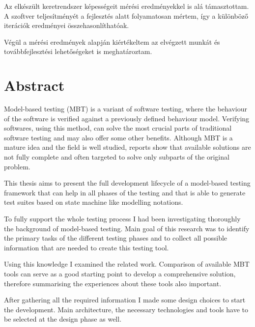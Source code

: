 Az elkészült keretrendszer képességeit mérési eredményekkel is alá támasztottam. A szoftver teljesítményét a fejlesztés alatt folyamatosan mértem, így a különböző iterációk eredményei összehasonlíthatóak.

Végül a mérési eredmények alapján kiértékeltem az elvégzett munkát és továbbfejlesztési lehetőségeket is meghatároztam.

\vfill
{}
\englishParagraph


\chapter*{Abstract}
\label{cha:abstract}

Model-based testing (MBT) is a variant of software testing, where the behaviour of the software is verified against a previously defined behaviour model. Verifying softwares, using this method, can solve the most crucial parts of traditional software testing and may also offer some other benefits. Although MBT is a mature idea and the field is well studied, reports show that available solutions are not fully complete and often targeted to solve only subparts of the original problem.

This thesis aims to present the full development lifecycle of a model-based testing framework that can help in all phases of the testing and that is able to generate test suites based on state machine like modelling notations.

To fully support the whole testing process I had been investigating thoroughly the background of model-based testing. Main goal of this research was to identify the primary tasks of the different testing phases and to collect all possible information that are needed to create this testing tool.

Using this knowledge I examined the related work. Comparison of available MBT tools can serve as a good starting point to develop a comprehensive solution, therefore summarising the experiences about these tools also important.

After gathering all the required information I made some design choices to start the development. Main architecture, the necessary technologies and tools have to be selected at the design phase as well.

